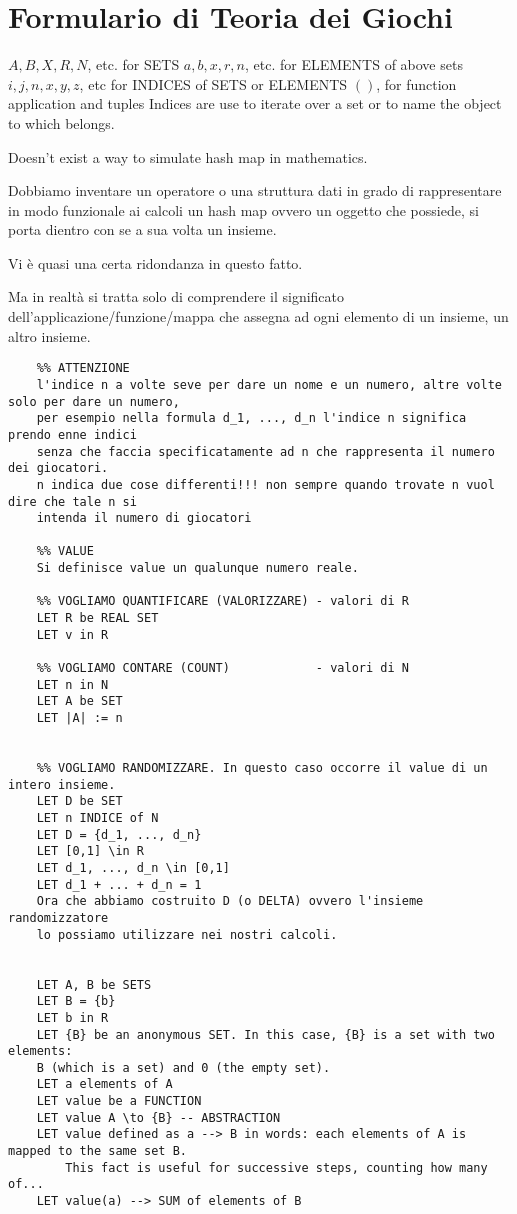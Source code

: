 \chapter{Formulario di Teoria dei Giochi}


$A, B, X, R, N$, etc. for SETS
$a, b, x, r, n$, etc. for ELEMENTS of above sets
$i, j, n, x, y, z$, etc for INDICES of SETS or ELEMENTS
$()$, for function application and tuples
Indices are use to iterate over a set or to name the object to which belongs.

Doesn't exist a way to simulate hash map in mathematics. 

Dobbiamo inventare un operatore o una struttura dati in grado di rappresentare in modo funzionale ai calcoli un hash map ovvero un oggetto che possiede, si porta dientro con se a sua volta un insieme.

Vi \`e quasi una certa ridondanza in questo fatto.

Ma in realt\`a si tratta solo di comprendere il significato dell'applicazione/funzione/mappa che assegna ad ogni elemento di un insieme, un altro insieme.


\begin{verbatim}
	%% ATTENZIONE
	l'indice n a volte seve per dare un nome e un numero, altre volte solo per dare un numero, 
	per esempio nella formula d_1, ..., d_n l'indice n significa prendo enne indici
	senza che faccia specificatamente ad n che rappresenta il numero dei giocatori. 
	n indica due cose differenti!!! non sempre quando trovate n vuol dire che tale n si
	intenda il numero di giocatori 

	%% VALUE
	Si definisce value un qualunque numero reale. 

    %% VOGLIAMO QUANTIFICARE (VALORIZZARE) - valori di R
    LET R be REAL SET
    LET v in R
    
    %% VOGLIAMO CONTARE (COUNT)            - valori di N 
    LET n in N
    LET A be SET
    LET |A| := n 
    
    
    %% VOGLIAMO RANDOMIZZARE. In questo caso occorre il value di un intero insieme.
    LET D be SET
    LET n INDICE of N
    LET D = {d_1, ..., d_n}   
    LET [0,1] \in R
    LET d_1, ..., d_n \in [0,1]
    LET d_1 + ... + d_n = 1    
    Ora che abbiamo costruito D (o DELTA) ovvero l'insieme randomizzatore 
    lo possiamo utilizzare nei nostri calcoli.
    
    
	LET A, B be SETS
	LET B = {b}
	LET b in R
	LET {B} be an anonymous SET. In this case, {B} is a set with two elements: 
	B (which is a set) and 0 (the empty set). 
	LET a elements of A 
	LET value be a FUNCTION
	LET value A \to {B} -- ABSTRACTION
	LET value defined as a --> B in words: each elements of A is mapped to the same set B. 
	    This fact is useful for successive steps, counting how many of...	    	    
	LET value(a) --> SUM of elements of B
\end{verbatim}

